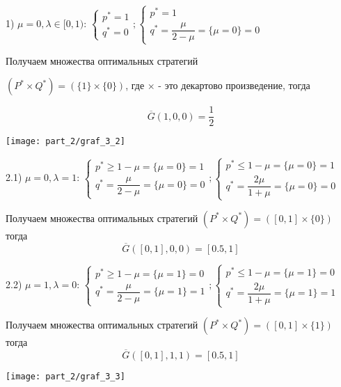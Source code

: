 1) $\mu = 0, \lambda \in [0, 1)$: 
$
	\begin{cases}
		p^* = 1 \\ 
		q^* = 0 
	\end{cases};
	\begin{cases}
		p^* = 1 \\
		q^* = \dfrac{\mu}{2 - \mu} = \{\mu = 0 \} = 0
	\end{cases}
$ 

\hfill \break

Получаем множества оптимальных стратегий 

$(P^* \times Q^*) = (\{1\} \times \{0\})$, где $\times$ - это декартово 
произведение, тогда

$$\overline G(1, 0, 0) = \dfrac{1}{2}$$

\begin{center}
\texttt{[image: part\_2/graf\_3\_2]}
\end{center}


2.1) $\mu=0, \lambda =1$: 
$
	\begin{cases}
		p^* \geqslant 1 - \mu = \{\mu = 0\} = 1 \\
		q^* = \dfrac{\mu}{2 - \mu} = \{\mu = 0\} = 0
	\end{cases};
	\begin{cases}
		p^* \leqslant 1 - \mu = \{\mu = 0\} = 1 \\
		q^* = \dfrac{2\mu}{1 + \mu} = \{\mu = 0\} = 0 
	\end{cases}
$

\hfill \break 
Получаем множества оптимальных стратегий 
$(P^* \times Q^*) = ([0, 1] \times \{0\})$ тогда
$$\overline G([0, 1], 0, 0) = [0.5, 1]$$

2.2) $\mu = 1, \lambda = 0$: 
$
	\begin{cases}
		p^* \geqslant 1-\mu = \{\mu=1\}=0 \\
		q^* = \dfrac{\mu}{2-\mu} = \{\mu=1\}=1
	\end{cases} ;
	\begin{cases}
		p^* \leqslant 1 - \mu = \{\mu = 1\} = 0\ \\
		q^* = \dfrac{2\mu}{1 + \mu} = \{\mu = 1\} = 1 
	\end{cases}
$

\hfill \break 
Получаем множества оптимальных стратегий 
$(P^* \times Q^*) = ([0, 1] \times \{1\})$ тогда
$$\overline G([0, 1], 1, 1) = [0.5, 1]$$

\begin{center}
\texttt{[image: part\_2/graf\_3\_3]}
\end{center}


